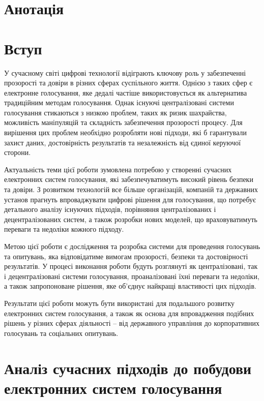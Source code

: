 \documentclass[14pt]{extreport}
\begin{document}
  \chapter*{Анотація}
  
  \tableofcontents
  \newpage
  
  \chapter*{Вступ}
  
  У сучасному світі цифрові технології відіграють ключову роль у забезпеченні прозорості та довіри в різних сферах суспільного життя. Однією з таких сфер є електронне голосування, яке дедалі частіше використовується як альтернатива традиційним методам голосування. Однак існуючі централізовані системи голосування стикаються з низкою проблем, таких як ризик шахрайства, можливість маніпуляцій та складність забезпечення прозорості процесу. Для вирішення цих проблем необхідно розробляти нові підходи, які б гарантували захист даних, достовірність результатів та незалежність від єдиної керуючої сторони.

  Актуальність теми цієї роботи зумовлена потребою у створенні сучасних електронних систем голосування, які забезпечуватимуть високий рівень безпеки та довіри. З розвитком технологій все більше організацій, компаній та державних установ прагнуть впроваджувати цифрові рішення для голосування, що потребує детального аналізу існуючих підходів, порівняння централізованих і децентралізованих систем, а також розробки нових моделей, що враховуватимуть переваги та недоліки кожного підходу.

  Метою цієї роботи є дослідження та розробка системи для проведення голосувань та опитувань, яка відповідатиме вимогам прозорості, безпеки та достовірності результатів. У процесі виконання роботи будуть розглянуті як централізовані, так і децентралізовані системи голосування, проаналізовані їхні переваги та недоліки, а також запропоноване рішення, яке об'єднує найкращі властивості цих підходів.

  Результати цієї роботи можуть бути використані для подальшого розвитку електронних систем голосування, а також як основа для впровадження подібних рішень у різних сферах діяльності – від державного управління до корпоративних голосувань та соціальних опитувань.
  
  \chapter{Аналіз сучасних підходів до побудови електронних систем голосування}
\end{document}
